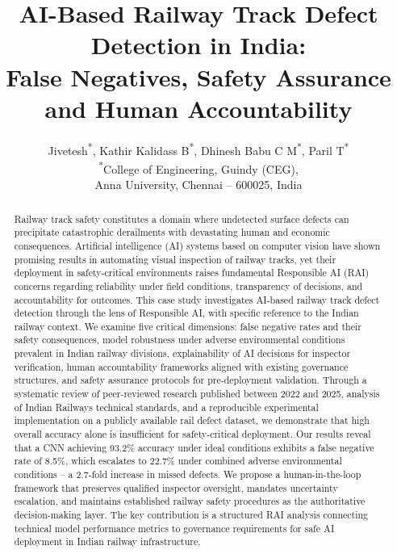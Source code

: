 \documentclass[conference]{IEEE}
\newcommand*{\affaddr}[1]{#1}
\newcommand*{\affmark}[1][*]{\textsuperscript{#1}}
\begin{document}
\title{AI-Based Railway Track Defect Detection in India:\\False Negatives, Safety Assurance and Human Accountability}

\author{
    Jivetesh\affmark[*], Kathir Kalidass B\affmark[*], Dhinesh Babu C M\affmark[*], Paril T\affmark[*]\\[0.5em]
    \affaddr{\affmark[*]College of Engineering, Guindy (CEG),\\Anna University, Chennai -- 600025, India}
}

\maketitle

\begin{abstract}
Railway track safety constitutes a domain where undetected surface defects can precipitate catastrophic derailments with devastating human and economic consequences. Artificial intelligence (AI) systems based on computer vision have shown promising results in automating visual inspection of railway tracks, yet their deployment in safety-critical environments raises fundamental Responsible AI (RAI) concerns regarding reliability under field conditions, transparency of decisions, and accountability for outcomes. This case study investigates AI-based railway track defect detection through the lens of Responsible AI, with specific reference to the Indian railway context. We examine five critical dimensions: false negative rates and their safety consequences, model robustness under adverse environmental conditions prevalent in Indian railway divisions, explainability of AI decisions for inspector verification, human accountability frameworks aligned with existing governance structures, and safety assurance protocols for pre-deployment validation. Through a systematic review of peer-reviewed research published between 2022 and 2025, analysis of Indian Railways technical standards, and a reproducible experimental implementation on a publicly available rail defect dataset, we demonstrate that high overall accuracy alone is insufficient for safety-critical deployment. Our results reveal that a CNN achieving 93.2\% accuracy under ideal conditions exhibits a false negative rate of 8.5\%, which escalates to 22.7\% under combined adverse environmental conditions -- a 2.7-fold increase in missed defects. We propose a human-in-the-loop framework that preserves qualified inspector oversight, mandates uncertainty escalation, and maintains established railway safety procedures as the authoritative decision-making layer. The key contribution is a structured RAI analysis connecting technical model performance metrics to governance requirements for safe AI deployment in Indian railway infrastructure.
\end{abstract}
\end{document}
